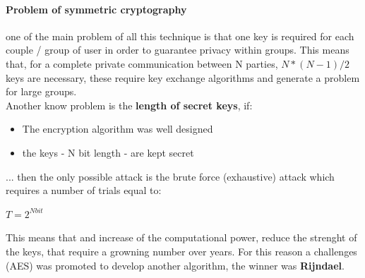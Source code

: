 \documentclass[12pt]{article}
\begin{document}
\paragraph{Problem of symmetric cryptography} one of the main problem of all this technique is that one key is required for each couple / group of user in order to guarantee privacy within groups. This means that, for a complete private communication between N parties, \textbf{$N*(N-1)/2$} keys are necessary, these require key exchange algorithms and generate a problem for large groups.\\
Another know problem is the \textbf{length of secret keys}, if:
\begin{itemize}
  \item The encryption algorithm was well designed
  \item the keys - N bit length - are kept secret
\end{itemize}
... then the only possible attack is the brute force (exhaustive) attack which requires a number of trials equal to:
\begin{center}
  $T = 2^{Nbit}$
\end{center}
This means that and increase of the computational power, reduce the strenght of the keys, that require a growning number over years. For this reason a challenges (AES) was promoted to develop another algorithm, the winner was \textbf{Rijndael}.
\end{document}
